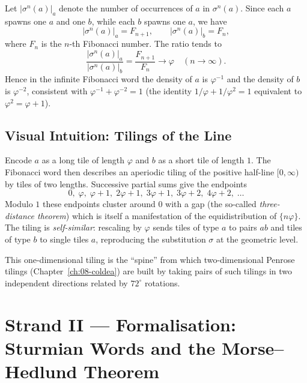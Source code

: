 Let \(|\sigma^n(a)|_a\) denote the number of occurrences of \(a\) in
\(\sigma^n(a)\).  Since each \(a\) spawns one \(a\) and one \(b\),
while each \(b\) spawns one \(a\), we have
\begin{equation}\label{eq:fib-count}
  |\sigma^n(a)|_a = F_{n+1}, \qquad |\sigma^n(a)|_b = F_n,
\end{equation}
where \(F_n\) is the \(n\)-th Fibonacci number.  The ratio tends to
\[
  \frac{|\sigma^n(a)|_a}{|\sigma^n(a)|_b}
  = \frac{F_{n+1}}{F_n} \to \varphi \quad (n\to\infty).
\]
Hence in the infinite Fibonacci word the density of \(a\) is
\(\varphi^{-1}\) and the density of \(b\) is \(\varphi^{-2}\),
consistent with \(\varphi^{-1}+\varphi^{-2}=1\) (the identity
\(1/\varphi+1/\varphi^2=1\) equivalent to \(\varphi^2=\varphi+1\)).

\subsection{Visual Intuition: Tilings of the Line}
\label{subsec:ch19-visual}

Encode \(a\) as a long tile of length \(\varphi\) and \(b\) as a
short tile of length \(1\).  The Fibonacci word then describes an
aperiodic tiling of the positive half-line
\(\bigl[0,\infty\bigr)\) by tiles of two lengths.  Successive partial
sums give the endpoints
\[
  0,\;\varphi,\;\varphi+1,\;2\varphi+1,\;3\varphi+1,\;
  3\varphi+2,\;4\varphi+2,\;\ldots
\]
Modulo \(1\) these endpoints cluster around \(0\) with a gap (the
so-called \emph{three-distance theorem}) which is itself a manifestation
of the equidistribution of \(\{n\varphi\}\).  The tiling is
\emph{self-similar}: rescaling by \(\varphi\) sends tiles of type
\(a\) to pairs \(ab\) and tiles of type \(b\) to single tiles \(a\),
reproducing the substitution \(\sigma\) at the geometric level.

This one-dimensional tiling is the ``spine'' from which
two-dimensional Penrose tilings (Chapter~\ref{ch:08-coldea}) are
built by taking pairs of such tilings in two independent directions
related by \(72^\circ\) rotations.

\section{Strand II --- Formalisation: Sturmian Words and the Morse--Hedlund Theorem}
\label{sec:ch19-strand-ii}

